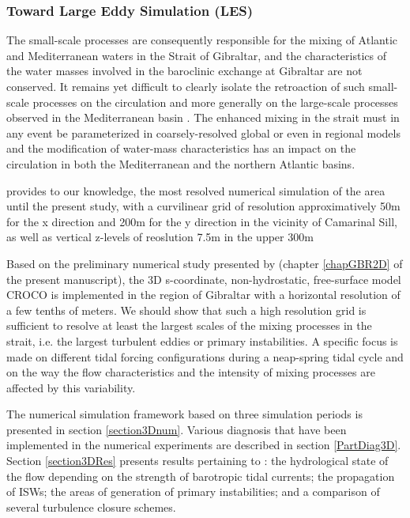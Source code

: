\subsubsection{Toward Large Eddy Simulation (LES)}

The small-scale processes are consequently responsible for the mixing of Atlantic and Mediterranean waters in the Strait of Gibraltar, and the characteristics of the water masses involved in the baroclinic exchange at Gibraltar are not conserved. It remains yet difficult to clearly isolate the retroaction of such small-scale processes on the circulation and more generally on the large-scale processes observed in the Mediterranean basin \citep{garcia-lafuente_2017}.
The enhanced mixing in the strait must in any event be parameterized in coarsely-resolved global or even in regional models and the modification of water-mass characteristics has an impact on the circulation in both the Mediterranean and the northern Atlantic basins. 

\citet{sanchez-garrido_2011} provides to our knowledge, the most resolved numerical simulation of the area until the present study, with a curvilinear grid of resolution approximatively 50m for the x direction and 200m for the y direction in the vicinity of Camarinal Sill, as well as vertical z-levels of reoslution 7.5m in the upper 300m

Based on the preliminary numerical study presented by \citet{hilt_2020} (chapter \ref{chapGBR2D} of the present manuscript), the 3D s-coordinate, non-hydrostatic, free-surface model CROCO is implemented in the region of Gibraltar with a horizontal resolution of a few tenths of meters. We should show that such a high resolution grid is sufficient to resolve at least the largest scales of the mixing processes in the strait, i.e. the largest turbulent eddies or primary instabilities. A specific focus is made on different tidal forcing configurations during a neap-spring tidal cycle and on the way the flow characteristics and the intensity of mixing processes are affected by this variability. 

The numerical simulation framework based on three simulation periods is presented in section \ref{section3Dnum}. Various diagnosis that have been implemented in the numerical experiments are described in section \ref{PartDiag3D}. Section \ref{section3DRes} presents results pertaining to : the hydrological state of the flow depending on the strength of barotropic tidal currents; the propagation of ISWs; the areas of generation of primary instabilities; and a comparison of several turbulence closure schemes.

